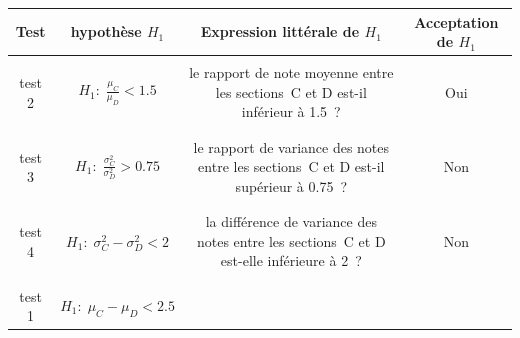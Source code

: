 \documentclass[10pt]{report}
\begin{document}
\begin{exercice}
\begin{enumerate}
\vspace*{1cm}

\hspace*{-1.3cm} \begin{tabular}{|c|c|c|c|}
\hline
Test  & hypoth{\`e}se $H_1$ & Expression litt{\'e}rale de $H_1$ & {\small{Acceptation de $H_1$ }} \\
\hline \hline&&&\\

test 2

&

${\displaystyle{H_1: \; \frac{\mu_C}{\mu_D} <1.5}}$

&

\begin{minipage}{7cm}
le rapport de note moyenne entre les  sections~C et D  est-il inférieur à 1.5~?
\end{minipage}

&
Oui \\&&&\\\hline &&&\\
test 3
&

${\displaystyle{H_1: \; \frac{\sigma_C^2}{\sigma_D^2} >0.75}}$

&

\begin{minipage}{7cm}
le rapport de variance des notes entre les  sections~C et D  est-il supérieur à 0.75~?
\end{minipage}

&

Non

\\&&&\\\hline &&&\\

test 4

&
 ${\displaystyle{H_1: \; \sigma_C^2 -\sigma_D^2 <2}}$
&

\begin{minipage}{7cm}
la différence de variance des notes entre les  sections~C et D  est-elle inférieure à 2~?
\end{minipage}

&

Non

\\&&&\\\hline&&&\\

test 1

&

${\displaystyle{H_1: \; \mu_C -\mu_D <2.5}}$


\end{tabular}
\end{enumerate}
\end{exercice}
\end{document}
